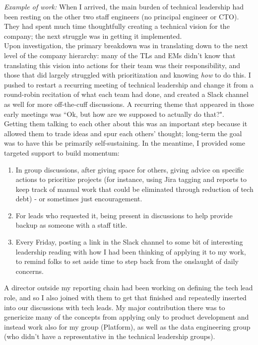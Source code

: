 \documentclass[margin,line]{resume}
\begin{document}
\begin{resume}
    \textit{Example of work:}  When I arrived, the main burden of technical
    leadership had been resting on the other two staff engineers (no principal
    engineer or CTO).  They had spent much time thoughtfully creating a
    technical vision for the company; the next struggle was in getting it
    implemented.\\
    Upon investigation, the primary breakdown was in translating down to the
    next level of the company hierarchy:  many of the TLs and EMs didn't know
    that translating this vision into actions for their team was their
    responsibility, and those that did largely struggled with prioritization
    and knowing \textit{how} to do this.  I pushed to restart a recurring
    meeting of technical leadership and change it from a round-robin recitation
    of what each team had done, and created a Slack channel as well for more
    off-the-cuff discussions. A recurring theme that appeared in those early
    meetings was ``Ok, but how are we supposed to actually do that?".\\
    Getting them talking to each other about this was an important step because
    it allowed them to trade ideas and spur each others' thought; long-term the
    goal was to have this be primarily self-sustaining.  In the meantime, I
    provided some targeted support to build momentum:
    \begin{enumerate}
        \item In group discussions, after giving space for others, giving
            advice on specific actions to prioritize projects (for instance,
            using Jira tagging and reports to keep track of manual work that
            could be eliminated through reduction of tech debt) - or sometimes
            just encouragement.
        \item For leads who requested it, being present in discussions to help
            provide backup as someone with a staff title.
        \item Every Friday, posting a link in the Slack channel to some bit of
            interesting leadership reading with how I had been thinking of
            applying it to my work, to remind folks to set aside time to step
            back from the onslaught of daily concerns.
    \end{enumerate}
    \vspace{-4mm}
    A director outside my reporting chain had been working on defining the tech
    lead role, and so I also joined with them to get that finished and
    repeatedly inserted into our discussions with tech leads.  My major
    contribution there was to genericize many of the concepts from applying
    only to product development and instead work also for my group (Platform),
    as well as the data engineering group (who didn't have a representative in
    the technical leadership groups).


\end{resume}
\end{document}
